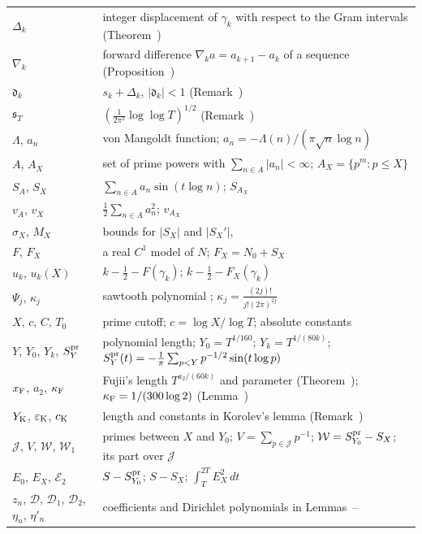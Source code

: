 \documentclass[preprint,12pt]{elsarticle}
\makeatletter
\let\CG@origref\ref
\let\CG@origeqref\eqref
\newcommand{\CG@gettip}[1]{\@ifundefined{CGTip@#1}{Reference: #1}{\csname CGTip@#1\endcsname}}
\DeclareRobustCommand{\CGref}[1]{\pdftooltip{\CG@origref{#1}}{\CG@gettip{#1}}}
\DeclareRobustCommand{\CGeqref}[1]{\pdftooltip{\CG@origeqref{#1}}{\CG@gettip{#1}}}
\numberwithin{equation}{section}
\theoremstyle{plain}
\theoremstyle{definition}
\theoremstyle{remark}
\newcommand{\NO}{N_0}
\makeatother
\begin{document}
\begin{center}
\begin{longtable}{p{}p{}}
$\Delta_k$ & integer displacement of $\gamma_k$ with respect to the Gram intervals (Theorem~\CGref{thm:known_korolev})\\
$\nabla_k$ & forward difference $\nabla_ka=a_{k+1}-a_k$ of a sequence (Proposition~\CGref{prop:deformation})\\
$\mathfrak d_k$ & $s_k+\Delta_k$, $|\mathfrak d_k|<1$ (Remark~\CGref{rem:korolev})\\
$\mathfrak s_T$ & $(\frac1{2\pi^2}\log\log T)^{1/2}$ (Remark~\CGref{rem:korolev})\\
$\Lambda$, $a_n$ & von Mangoldt function; $a_n=-\Lambda(n)/(\pi\sqrt n\log n)$\\
$A$, $A_X$ & set of prime powers with $\sum_{n\in A}|a_n|<\infty$; $A_X=\{p^m:p\le X\}$\\
$S_A$, $S_X$ & $\sum_{n\in A}a_n\sin(t\log n)$; $S_{A_X}$\\
$v_A$, $v_X$ & $\frac12\sum_{n\in A}a_n^2$; $v_{A_X}$\\
$\sigma_X$, $M_X$ & bounds for $|S_X|$ and $|S_X'|$, \CGeqref{eq:sigma_M_def}\\
$F$, $F_X$ & a real $C^1$ model of $N$; $F_X=\NO+S_X$\\
$u_k$, $u_k(X)$ & $k-\frac12-F(\gamma_k)$; $k-\frac12-F_X(\gamma_k)$\\
$\Psi_j$, $\kappa_j$ & sawtooth polynomial \CGeqref{eq:Psi_def}; $\kappa_j=\frac{(2j)!}{j!(2\pi)^{2j}}$\\
$X$, $c$, $C$, $T_0$ & prime cutoff; $c=\log X/\log T$; absolute constants\\
$Y$, $Y_0$, $Y_k$, $S^{\rm pr}_Y$ & polynomial length; $Y_0=T^{1/160}$; $Y_k=T^{1/(80k)}$; $S^{\rm pr}_Y(t)=-\frac1\pi\sum_{p<Y}p^{-1/2}\sin(t\log p)$\\
$x_{\rm F}$, $a_2$, $\kappa_{\rm F}$ & Fujii's length $T^{a_2/(60k)}$ and parameter (Theorem~\CGref{thm:known_fujii_selberg}); $\kappa_{\rm F}=1/(300\log2)$ (Lemma~\CGref{lem:selberg_uniform})\\
$Y_{\rm K}$, $\varepsilon_{\rm K}$, $c_{\rm K}$ & length and constants in Korolev's lemma (Remark~\CGref{rem:korolev_uniform})\\
$\mathcal J$, $V$, $\mathcal W$, $\mathcal W_1$ & primes between $X$ and $Y_0$; $V=\sum_{p\in\mathcal J}p^{-1}$; $\mathcal W=S^{\rm pr}_{Y_0}-S_X$; its part over $\mathcal J$ \CGeqref{eq:D_def}\\
$E_0$, $E_X$, $\mathcal E_2$ & $S-S^{\rm pr}_{Y_0}$; $S-S_X$; $\int_T^{2T}E_X^2\,dt$\\
$z_n$, $\mathcal D$, $\mathcal D_1$, $\mathcal D_2$, $\eta_n$, $\eta'_n$ & coefficients and Dirichlet polynomials in Lemmas~\CGref{lem:trig_MV}--\CGref{lem:D_moments}\\

\end{longtable}
\end{center}
\end{document}
